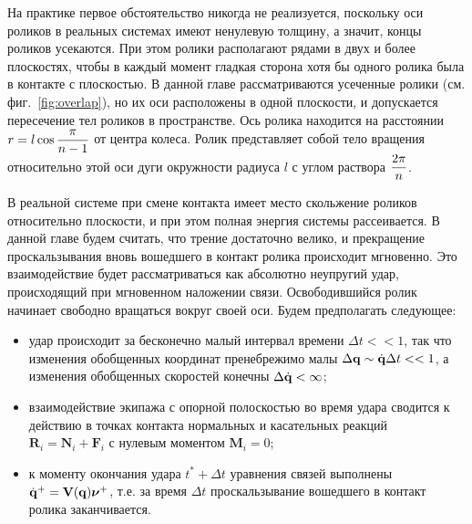На практике первое обстоятельство никогда не реализуется, поскольку оси роликов в реальных системах имеют ненулевую толщину, а значит, концы роликов усекаются. При этом ролики располагают рядами в двух и более плоскостях, чтобы в каждый момент гладкая сторона хотя бы одного ролика была в контакте с плоскостью. В данной главе рассматриваются усеченные ролики (см. фиг.~\ref{fig:overlap}), но их оси расположены в одной плоскости, и допускается пересечение тел роликов в пространстве. Ось ролика находится на расстоянии $r = l\cos\displaystyle\frac{\displaystyle \pi}{\displaystyle n-1}$ от центра колеса. Ролик представляет собой тело вращения относительно этой оси дуги окружности радиуса $l$ с углом раствора $\displaystyle\frac{\displaystyle 2\pi}{\displaystyle n}$.


В реальной системе при смене контакта имеет место скольжение роликов относительно плоскости, и при этом полная энергия системы рассеивается. В данной главе будем считать, что трение достаточно велико, и прекращение проскальзывания вновь вошедшего в контакт ролика происходит мгновенно. Это взаимодействие будет рассматриваться как абсолютно неупругий удар, происходящий при мгновенном наложении связи.
Освободившийся ролик начинает свободно вращаться вокруг своей оси.
Будем предполагать следующее:
\begin{itemize}
    \item удар происходит за бесконечно малый интервал времени $\Delta t << 1$, так что изменения обобщенных координат пренебрежимо малы $\Delta \mathbf{q} \sim \dot{\mathbf{q}}\Delta t << 1$, а изменения обобщенных скоростей конечны $\Delta \dot{\mathbf{q}} < \infty$;
    \item взаимодействие экипажа с опорной полоскостью во время удара сводится к действию в точках контакта нормальных и касательных реакций $\mathbf{R}_i = \mathbf{N}_i + \mathbf{F}_i$ с нулевым моментом $\mathbf{M}_i = 0$;
    \item к моменту окончания удара $t^*+\Delta t$ уравнения связей выполнены $\dot{\mathbf{q}}^+ = \mathbf{V}(\mathbf{q})\boldsymbol{\mathbf{\nu}}^+$, т.е. за время $\Delta t$ проскальзывание вошедшего в контакт ролика заканчивается.
\end{itemize}


